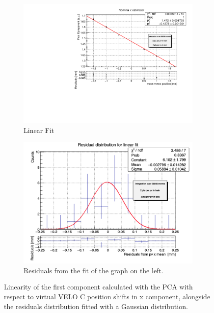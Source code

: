 \begin{figure}
    \centering
    \begin{subfigure}{0.48\textwidth}
    \includegraphics[width=\linewidth]{figures/x_fit_veloC_MC.pdf}
    \caption{Linear Fit}\label{fig:x_veloC_fit_MC}
    \end{subfigure}
    \begin{subfigure}{0.48\textwidth}
    \includegraphics[width=\linewidth]{figures/x_res_veloC_MC.png}
    \caption{Residuals from the fit of the graph on the left. }\label{fig:x_veloC_res_MC}
    \end{subfigure}
    \caption{Linearity of the first component calculated with the PCA with respect to  virtual VELO C position shifts in x component, alongside the residuals distribution fitted with a Gaussian distribution.}
    \label{fig:x_veloC_MC}
\end{figure}
